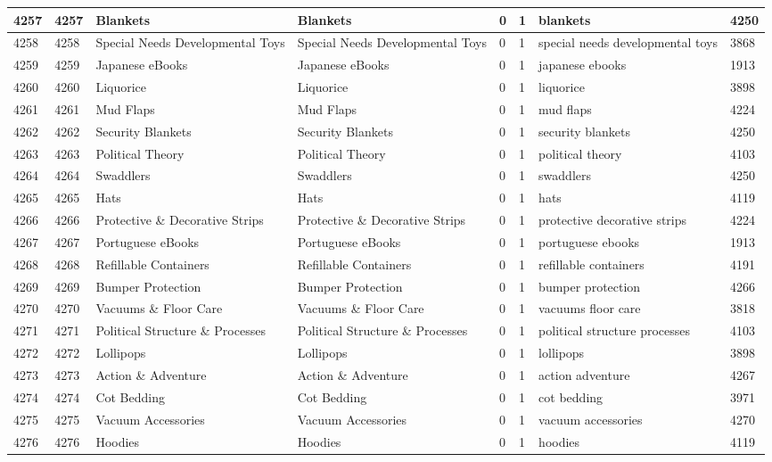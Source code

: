 \begin{longtable}{|l|l|l|l|l|l|l|l|}
4257 & 4257 & Blankets & Blankets & 0 & 1 & blankets & 4250 \\ \hline 
4258 & 4258 & Special Needs Developmental Toys & Special Needs Developmental Toys & 0 & 1 & special needs developmental toys & 3868 \\ \hline 
4259 & 4259 & Japanese eBooks & Japanese eBooks & 0 & 1 & japanese ebooks & 1913 \\ \hline 
4260 & 4260 & Liquorice & Liquorice & 0 & 1 & liquorice & 3898 \\ \hline 
4261 & 4261 & Mud Flaps & Mud Flaps & 0 & 1 & mud flaps & 4224 \\ \hline 
4262 & 4262 & Security Blankets & Security Blankets & 0 & 1 & security blankets & 4250 \\ \hline 
4263 & 4263 & Political Theory & Political Theory & 0 & 1 & political theory & 4103 \\ \hline 
4264 & 4264 & Swaddlers & Swaddlers & 0 & 1 & swaddlers & 4250 \\ \hline 
4265 & 4265 & Hats & Hats & 0 & 1 & hats & 4119 \\ \hline 
4266 & 4266 & Protective \& Decorative Strips & Protective \& Decorative Strips & 0 & 1 & protective decorative strips & 4224 \\ \hline 
4267 & 4267 & Portuguese eBooks & Portuguese eBooks & 0 & 1 & portuguese ebooks & 1913 \\ \hline 
4268 & 4268 & Refillable Containers & Refillable Containers & 0 & 1 & refillable containers & 4191 \\ \hline 
4269 & 4269 & Bumper Protection & Bumper Protection & 0 & 1 & bumper protection & 4266 \\ \hline 
4270 & 4270 & Vacuums \& Floor Care & Vacuums \& Floor Care & 0 & 1 & vacuums floor care & 3818 \\ \hline 
4271 & 4271 & Political Structure \& Processes & Political Structure \& Processes & 0 & 1 & political structure processes & 4103 \\ \hline 
4272 & 4272 & Lollipops & Lollipops & 0 & 1 & lollipops & 3898 \\ \hline 
4273 & 4273 & Action \& Adventure & Action \& Adventure & 0 & 1 & action adventure & 4267 \\ \hline 
4274 & 4274 & Cot Bedding & Cot Bedding & 0 & 1 & cot bedding & 3971 \\ \hline 
4275 & 4275 & Vacuum Accessories & Vacuum Accessories & 0 & 1 & vacuum accessories & 4270 \\ \hline 
4276 & 4276 & Hoodies & Hoodies & 0 & 1 & hoodies & 4119 \\ \hline 

\end{longtable}
